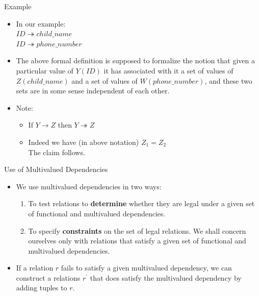 \documentclass{beamer}
\begin{document}
\begin{frame}{Example}
    \begin{itemize}
        \item In our example: \\
            \quad $ID \twoheadrightarrow child\_name$ \\
            \quad $ID \twoheadrightarrow phone\_number$ \\

        \item The above formal definition is supposed to formalize the notion that given a particular value of $Y(ID)$ it has associated with it a set of values of $Z(child\_name)$ and a set of values of $W(phone\_number)$, and these two sets are in some sense independent of each other.

        \item Note:
            \begin{itemize}
                \item If $Y \rightarrow Z$ then $Y \twoheadrightarrow Z$
                \item Indeed we have (in above notation) $Z_1 = Z_2$ \\
                    The claim follows.
            \end{itemize}
    \end{itemize}
\end{frame}

\begin{frame}{Use of Multivalued Dependencies}
    \begin{itemize}
        \item We use multivalued dependencies in two ways:
            \begin{enumerate}
                \item To test relations to \textbf{determine} whether they are legal under a given set of functional and multivalued dependencies.
                \item To specify \textbf{constraints} on the set of legal relations. We shall concern ourselves only with relations that satisfy a given set of functional and multivalued dependencies.
            \end{enumerate}

        \item If a relation $r$ fails to satisfy a given multivalued dependency, we can construct a relations $r^\prime$ that does satisfy the multivalued dependency by adding tuples to $r$.
    \end{itemize}
\end{frame}
\end{document}
